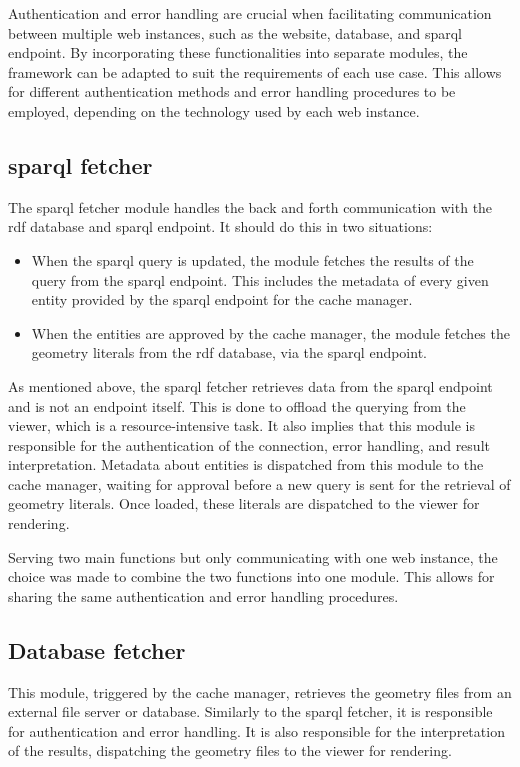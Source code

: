 Authentication and error handling are crucial when facilitating communication between multiple web instances, such as the website, database, and \ac{sparql} endpoint. By incorporating these functionalities into separate modules, the framework can be adapted to suit the requirements of each use case. This allows for different authentication methods and error handling procedures to be employed, depending on the technology used by each web instance.

\subsection{\acs{sparql} fetcher}
The \acs{sparql} fetcher module handles the back and forth communication with the \ac{rdf} database and \ac{sparql} endpoint. It should do this in two situations:

\begin{itemize}
  \item When the \ac{sparql} query is updated, the module fetches the results of the query from the \ac{sparql} endpoint. This includes the metadata of every given entity provided by the \ac{sparql} endpoint for the cache manager.
  \item When the entities are approved by the cache manager, the module fetches the geometry literals from the \ac{rdf} database, via the \ac{sparql} endpoint.
\end{itemize}

As mentioned above, the \ac{sparql} fetcher retrieves data from the \ac{sparql} endpoint and is not an endpoint itself. This is done to offload the querying from the viewer, which is a resource-intensive task. It also implies that this module is responsible for the authentication of the connection, error handling, and result interpretation. Metadata about entities is dispatched from this module to the cache manager, waiting for approval before a new query is sent for the retrieval of geometry literals. Once loaded, these literals are dispatched to the viewer for rendering.

Serving two main functions but only communicating with one web instance, the choice was made to combine the two functions into one module. This allows for sharing the same authentication and error handling procedures.

\subsection{Database fetcher} \label{sec:databaseFetcher}
This module, triggered by the cache manager, retrieves the geometry files from an external file server or database. Similarly to the \ac{sparql} fetcher, it is responsible for authentication and error handling. It is also responsible for the interpretation of the results, dispatching the geometry files to the viewer for rendering.

